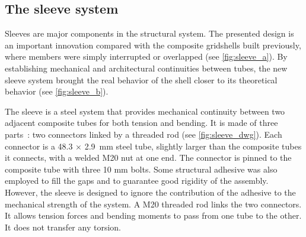 \subsection{The sleeve system}

Sleeves are major components in the structural system. The presented design is an important innovation compared with the composite gridshells built previously, where members were simply interrupted or overlapped (see \cref{fig:sleeve_a}). By establishing mechanical and architectural continuities between tubes, the new sleeve system brought the real behavior of the shell closer to its theoretical behavior (see \cref{fig:sleeve_b}).

The sleeve is a steel system that provides mechanical continuity between two adjacent composite tubes for both tension and bending. It is made of three parts~: two connectors linked by a threaded rod (see \cref{fig:sleeve_dwg}). Each connector is a 48.3 × \SI{2.9}{mm} steel tube, slightly larger than the composite tubes it connects, with a welded M20 nut at one end. The connector is pinned to the composite tube with three 10 mm bolts. Some structural adhesive was also employed to fill the gaps and to guarantee good rigidity of the assembly. However, the sleeve is designed to ignore the contribution of the adhesive to the mechanical strength of the system. A M20 threaded rod links the two connectors. It allows tension forces and bending moments to pass from one tube to the other. It does not transfer any torsion.

{%
\enlargethispage{-6cm}
}

